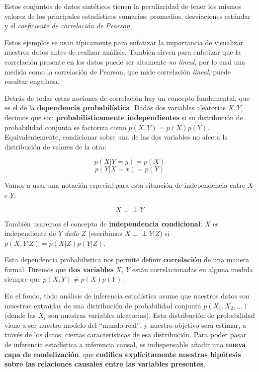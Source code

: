 \documentclass[
  a4paper,
  DIV=11,
  numbers=noendperiod]{scrreprt}
\begin{document}
Estos conjuntos de datos sintéticos tienen la peculiaridad de tener los
mismos valores de los principales estadísticos sumarios: promedios,
desviaciones estándar y el \emph{coeficiente de correlación de Pearson}.

Estos ejemplos se usan típicamente para enfatizar la importancia de
visualizar nuestros datos antes de realizar análisis. También sirven
para enfatizar que la correlación presente en los datos puede ser
altamente \emph{no lineal}, por lo cual una medida como la correlación
de Pearson, que mide correlación \emph{lineal}, puede resultar engañosa.

Detrás de todas estas nociones de correlación hay un concepto
fundamental, que es el de la \textbf{dependencia probabilística}. Dadas
dos variables aleatorias \(X, Y\), decimos que son
\textbf{probabilísticamente independientes} si su distribución de
probabilidad conjunta se factoriza como \(p(X, Y) = p(X) p(Y)\).
Equivalentemente, condicionar sobre una de las dos variables no afecta
la distribución de valores de la otra:

\[ p(X | Y=y) = p(X) \] \[ p(Y | X=x) = p(Y) \]

Vamos a usar una notación especial para esta situación de independencia
entre \(X\) e \(Y\):

\[\newcommand{\indep}{\perp \!\!\! \perp} X \indep Y\]

También usaremos el concepto de \textbf{independencia condicional}:
\(X\) es independiente de \(Y\) \emph{dado} \(Z\) (escribimos
\(X \perp \!\!\! \perp Y | Z\)) si \(p(X, Y | Z) = p(X | Z) p(Y | Z)\).

Esta dependencia probabilistica nos permite definir \textbf{correlación}
de una manera formal. Diremos que \textbf{dos variables} \(X\), \(Y\)
están correlacionadas en alguna medida siempre que
\(p(X, Y) \neq p(X) p(Y)\).

En el fondo, todo análisis de inferencia estadística asume que nuestros
datos son muestras extraídas de una distribución de probabilidad
conjunta \(p(X_1, X_2, \dots)\) (donde las \(X_i\) son nuestras
variables aleatorias). Esta distribución de probabilidad viene a ser
nuestro modelo del ``mundo real'', y nuestro objetivo será estimar, a
través de los datos, ciertas características de esa distribución. Para
poder pasar de inferencia estadística a inferencia causal, es
indispensable añadir una \textbf{nueva capa de modelización}, que
\textbf{codifica explícitamente nuestras hipótesis sobre las relaciones
causales entre las variables presentes}.
\end{document}
